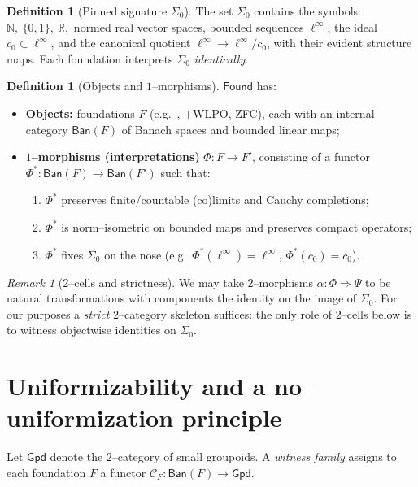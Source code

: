 \documentclass[11pt]{article}
\theoremstyle{definition}
\newtheorem{definition}[theorem]{Definition}
\theoremstyle{remark}
\newtheorem{remark}[theorem]{Remark}
\newcommand{\N}{\mathbb{N}}
\newcommand{\R}{\mathbb{R}}
\newcommand{\cnull}{c_0}
\newcommand{\linf}{\ell^\infty}
\newcommand{\WLPO}{\mathrm{WLPO}}
\newcommand{\BISH}{\mathrm{BISH}}
\newcommand{\Found}{\mathsf{Found}}
\newcommand{\Ban}{\mathsf{Ban}}
\newcommand{\Gpd}{\mathsf{Gpd}}
\newcommand{\SigmaZero}{\Sigma_{0}}
\begin{document}
\begin{definition}[Pinned signature \(\SigmaZero\)]
The set \(\SigmaZero\) contains the symbols: \(\N,\ \{0,1\},\ \R,\) normed real vector spaces, bounded sequences \(\linf\), the ideal \(\cnull\subset\linf\), and the canonical quotient \(\linf\to \linf/\cnull\), with their evident structure maps. Each foundation interprets \(\SigmaZero\) \emph{identically}.
\end{definition}

\begin{definition}[Objects and $1$--morphisms]
\(\Found\) has:
\begin{itemize}
\item \textbf{Objects:} foundations \(F\) (e.g.\ \BISH, \BISH+$\WLPO$, ZFC), each with an internal category \(\Ban(F)\) of Banach spaces and bounded linear maps;
\item \textbf{$1$--morphisms (interpretations)} \(\Phi:F\to F'\), consisting of a functor \(\Phi^*:\Ban(F)\to\Ban(F')\) such that:
  \begin{enumerate}
  \item \(\Phi^*\) preserves finite/countable (co)limits and Cauchy completions;
  \item $\Phi^*$ is norm--isometric on bounded maps and preserves compact operators;
  \item $\Phi^*$ fixes \(\SigmaZero\) on the nose (e.g.\ \(\Phi^*(\linf)=\linf\), \(\Phi^*(\cnull)=\cnull\)).
  \end{enumerate}
\end{itemize}
\end{definition}

\begin{remark}[2--cells and strictness]
We may take \(2\)--morphisms \(\alpha:\Phi\Rightarrow\Psi\) to be natural transformations with components the identity on the image of \(\SigmaZero\). For our purposes a \emph{strict} $2$--category skeleton suffices: the only role of $2$--cells below is to witness objectwise identities on \(\SigmaZero\).
\end{remark}

\section{Uniformizability and a no--uniformization principle}\label{sec:uniform}

Let \(\Gpd\) denote the $2$--category of small groupoids. A \emph{witness family} assigns to each foundation \(F\) a functor \(\mathcal C_F:\Ban(F)\to\Gpd\).
\end{document}
